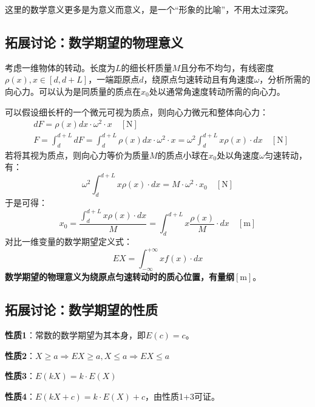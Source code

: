 \begin{tcolorbox}
这里的数学意义更多是为意义而意义，是一个“形象的比喻”，不用太过深究。
\end{tcolorbox}

\subsection{拓展讨论：数学期望的物理意义}

考虑一维物体的转动。长度为$L$的细长杆质量$M$且分布不均匀，有线密度$\rho \left( x \right) ,x\in \left[ d,d+L \right] $，一端距原点$d$，绕原点匀速转动且有角速度$\omega $，分析所需的向心力。可以认为是同质量的质点在$x_0$处以通常角速度转动所需的向心力。

可以假设细长杆的一个微元可视为质点，则向心力微元和整体向心力：
\begin{align*}
&dF=\rho \left( x \right) dx\cdot \omega ^2\cdot x\quad \left[ \mathrm{N} \right] \\
&F=\int_d^{d+L}{dF}=\int_d^{d+L}{\rho \left( x \right) dx\cdot \omega ^2\cdot x}=\omega ^2\int_d^{d+L}{x\rho \left( x \right) \cdot dx}\quad \left[ \mathrm{N} \right]
\end{align*}
若将其视为质点，则向心力等价为质量$M$的质点小球在$x_0$处以角速度$\omega $匀速转动，有：
\[
\omega ^2\int_d^{d+L}{x\rho \left( x \right) \cdot dx}=M\cdot \omega ^2\cdot x_0\quad \left[ \mathrm{N} \right]
\]
于是可得：
\[
x_0=\frac{\int_d^{d+L}{x\rho \left( x \right) \cdot dx}}{M}=\int_d^{d+L}{x\frac{\rho \left( x \right)}{M}\cdot dx}\quad \left[ \mathrm{m} \right]
\]
对比一维变量的数学期望定义式：
\[
EX=\int_{-\infty}^{+\infty}{xf\left( x \right) \cdot dx}
\]
{\bf 数学期望的物理意义为绕原点匀速转动时的质心位置，有量纲$\left[ \mathrm{m} \right] $}。

\subsection{拓展讨论：数学期望的性质}

{\bf 性质1}：常数的数学期望为其本身，即$E\left( c \right) =c$。

{\bf 性质2}：$X\geqslant a\Rightarrow EX\geqslant a,X\leqslant a\Rightarrow EX\leqslant a$

{\bf 性质3}：$E\left( kX \right) =k\cdot E\left( X \right) $

{\bf 性质4}：$E\left( kX+c \right) =k\cdot E\left( X \right) +c$，由性质1+3可证。

